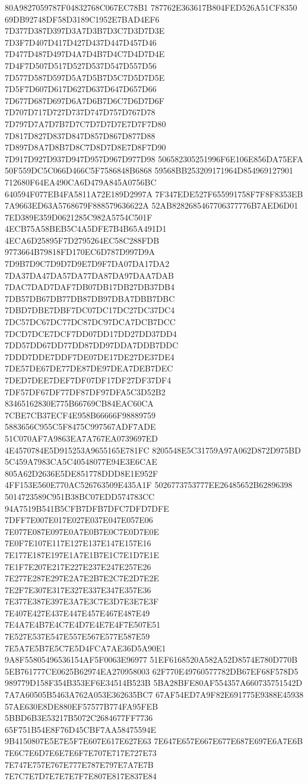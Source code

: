 80A9827059787F04832768C067EC78B1
787762E363617B804FED526A51CF8350
69DB92748DF58D3189C1952E7BAD4EF6
7D377D387D397D3A7D3B7D3C7D3D7D3E
7D3F7D407D417D427D437D447D457D46
7D477D487D497D4A7D4B7D4C7D4D7D4E
7D4F7D507D517D527D537D547D557D56
7D577D587D597D5A7D5B7D5C7D5D7D5E
7D5F7D607D617D627D637D647D657D66
7D677D687D697D6A7D6B7D6C7D6D7D6F
7D707D717D727D737D747D757D767D78
7D797D7A7D7B7D7C7D7D7D7E7D7F7D80
7D817D827D837D847D857D867D877D88
7D897D8A7D8B7D8C7D8D7D8E7D8F7D90
7D917D927D937D947D957D967D977D98
506582305251996F6E106E856DA75EFA
50F559DC5C066D466C5F7586848B6868
59568BB253209171964D854969127901
712680F64EA490CA6D479A845A0756BC
640594F077EB4FA5811A72E189D2997A
7F347EDE527F655991758F7F8F8353EB
7A9663ED63A5768679F888579636622A
52AB8282685467706377776B7AED6D01
7ED389E359D0621285C982A5754C501F
4ECB75A58BEB5C4A5DFE7B4B65A491D1
4ECA6D25895F7D2795264EC58C288FDB
9773664B79818FD170EC6D787D997D9A
7D9B7D9C7D9D7D9E7D9F7DA07DA17DA2
7DA37DA47DA57DA77DA87DA97DAA7DAB
7DAC7DAD7DAF7DB07DB17DB27DB37DB4
7DB57DB67DB77DB87DB97DBA7DBB7DBC
7DBD7DBE7DBF7DC07DC17DC27DC37DC4
7DC57DC67DC77DC87DC97DCA7DCB7DCC
7DCD7DCE7DCF7DD07DD17DD27DD37DD4
7DD57DD67DD77DD87DD97DDA7DDB7DDC
7DDD7DDE7DDF7DE07DE17DE27DE37DE4
7DE57DE67DE77DE87DE97DEA7DEB7DEC
7DED7DEE7DEF7DF07DF17DF27DF37DF4
7DF57DF67DF77DF87DF97DFA5C3D52B2
83465162830E775B66769CB84EAC60CA
7CBE7CB37ECF4E958B66666F98889759
5883656C955C5F8475C997567ADF7ADE
51C070AF7A9863EA7A767EA0739697ED
4E4570784E5D915253A9655165E781FC
8205548E5C31759A97A062D872D975BD
5C459A7983CA5C40548077E94E3E6CAE
805A62D2636E5DE851778DDD8E1E952F
4FF153E560E770AC526763509E435A1F
5026773753777EE26485652B62896398
5014723589C951B38BC07EDD574783CC
94A7519B541B5CFB7DFB7DFC7DFD7DFE
7DFF7E007E017E027E037E047E057E06
7E077E087E097E0A7E0B7E0C7E0D7E0E
7E0F7E107E117E127E137E147E157E16
7E177E187E197E1A7E1B7E1C7E1D7E1E
7E1F7E207E217E227E237E247E257E26
7E277E287E297E2A7E2B7E2C7E2D7E2E
7E2F7E307E317E327E337E347E357E36
7E377E387E397E3A7E3C7E3D7E3E7E3F
7E407E427E437E447E457E467E487E49
7E4A7E4B7E4C7E4D7E4E7E4F7E507E51
7E527E537E547E557E567E577E587E59
7E5A7E5B7E5C7E5D4FCA7AE36D5A90E1
9A8F55805496536154AF5F0063E96977
51EF6168520A582A52D8574E780D770B
5EB761777CE0625B62974EA270958003
62F770E49760577782DB67EF68F578D5
989779D158F354B353EF6E34514B523B
5BA28BFE80AF554357A660735751542D
7A7A60505B5463A762A053E362635BC7
67AF54ED7A9F82E691775E9388E45938
57AE630E8DE880EF57577B774FA95FEB
5BBD6B3E53217B5072C2684677FF7736
65F751B54E8F76D45CBF7AA58475594E
9B4150807E5E7E5F7E607E617E627E63
7E647E657E667E677E687E697E6A7E6B
7E6C7E6D7E6E7E6F7E707E717E727E73
7E747E757E767E777E787E797E7A7E7B
7E7C7E7D7E7E7E7F7E807E817E837E84
